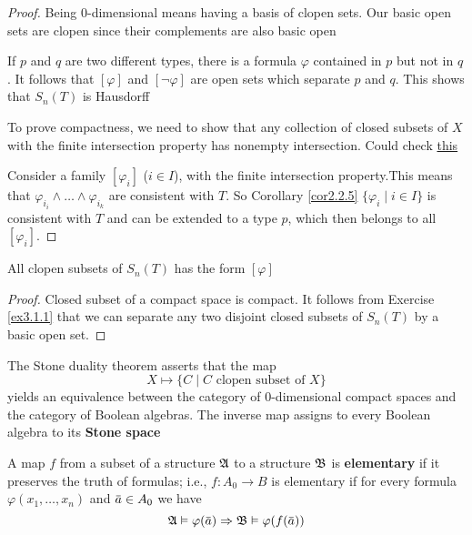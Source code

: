 \documentclass[11pt]{article}
\begin{document}
\begin{proof}
Being 0-dimensional means having a basis of clopen sets. Our basic open sets
are clopen since their complements are also basic open

If \(p\) and \(q\) are two different types, there is a formula \(\varphi\) contained in
\(p\) but not in \(q\). It follows that \([\varphi]\) and \([\neg\varphi]\) are
open sets which separate \(p\) and \(q\). This shows that \(S_n(T)\) is
Hausdorff

To prove compactness, we need to show that any collection of closed subsets
of \(X\) with the finite intersection property has nonempty intersection.
Could check  \href{http://www.msc.uky.edu/droyster/courses/fall99/math4181/classnotes/notes5.pdf}{this}

Consider a family \([\varphi_i]\) (\(i\in I\)), with the finite intersection property.This
means that \(\varphi_{i_i}\wedge\dots\wedge\varphi_{i_k}\) are consistent
with \(T\). So Corollary \ref{cor2.2.5} \(\{\varphi_i\mid i\in I\}\) is
consistent with \(T\) and can be extended to a type \(p\), which then belongs
to all \([\varphi_i]\).  
\end{proof}

\begin{lemma}[]
\label{lemma4.2.3}
All clopen subsets of \(S_n(T)\) has the form \([\varphi]\)
\end{lemma}

\begin{proof}
Closed subset of a compact space is compact. It follows from Exercise \ref{ex3.1.1} that we can
separate any two disjoint
closed subsets of \(S_n(T)\) by a basic open set.
\end{proof}

The Stone duality theorem asserts that the map
\begin{equation*}
X\mapsto\{C\mid C\text{ clopen subset of }X\}
\end{equation*}
yields an equivalence between the category of 0-dimensional compact spaces
and the category of Boolean algebras. The inverse map assigns to every
Boolean algebra to its \textbf{Stone space}

\begin{definition}[]


A map \(f\) from a subset of a structure \(\mathfrak{A}\) to a structure \(\mathfrak{B}\) is
\textbf{elementary} if it preserves the truth of formulas; i.e., \(f:A_0\to B\) is
elementary if for every formula \(\varphi(x_1,\dots,x_n)\) and \(\bbar{a}\in A_0\)
we have
\begin{equation*}
\fA\vDash\varphi(\bbar{a})\Rightarrow\fB\vDash\varphi(f(\bbar{a}))
\end{equation*}
\end{definition}
\end{document}

